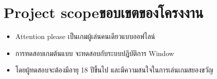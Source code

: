 \section{\ifenglish Project scope\else ขอบเขตของโครงงาน\fi}
\begin{itemize}
    \item Attention please เป็นเกมผู้เล่นคนเดียวแบบออฟไลน์
    \item การทดสอบเกมต้นแบบ จะทดสอบกับระบบปฏิบัติการ Window
    \item โดยผู้ทดสอบจะต้องมีอายุ 18 ปีขึ้นไป และมีความสนใจในการเล่นเกมสยองขวัญ
\end{itemize}





